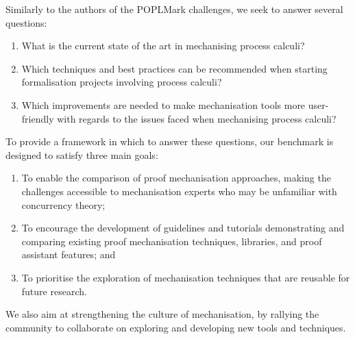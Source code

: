 \documentclass[runningheads]{llncs}
\begin{document}
Similarly to the authors of the POPLMark challenges, we seek to
answer several questions:
\begin{enumerate}[label=\textbf{(Q\arabic*)},leftmargin=10mm]
\item\label{item:rq1} What is the current state of the art in mechanising process calculi?
\item\label{item:rq2} Which techniques and best practices can be recommended when starting formalisation projects involving process calculi?
\item\label{item:rq3} Which improvements are needed to make mechanisation tools more user-friendly with regards to the issues faced when mechanising process calculi?
\end{enumerate}

To provide a framework in which to answer these questions, our benchmark is designed to satisfy three main goals:
\begin{enumerate}[label=\textbf{(G\arabic*)},leftmargin=10mm]
\item\label{item:goal-comperison-accessibility} To enable the comparison of
  proof mechanisation approaches, making the challenges accessible to
  mechanisation experts who may be unfamiliar with concurrency theory;

\item\label{item:goal-tutorials} To encourage the development of guidelines and
  tutorials demonstrating and comparing existing proof mechanisation
  techniques, libraries, and proof assistant features; and

\item\label{item:goal-reusability} To prioritise the exploration of mechanisation
  techniques that are reusable for future research.
\end{enumerate}
We also aim at strengthening the culture of mechanisation, by rallying the community to collaborate on exploring and developing new tools and techniques.
\end{document}
